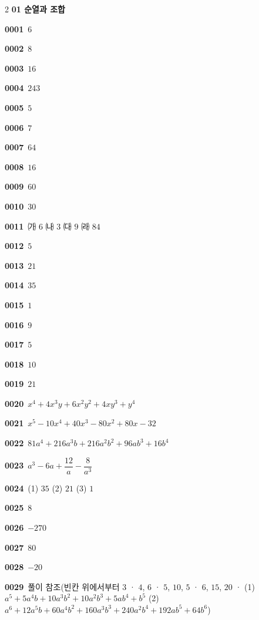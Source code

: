 \documentclass[10pt,a4paper]{article}
\begin{document}
\begin{multicols}{2}\small
\noindent\textbf{01 순열과 조합}\par\smallskip
\noindent\textbf{0001}\ $6$\par
\noindent\textbf{0002}\ $8$\par
\noindent\textbf{0003}\ $16$\par
\noindent\textbf{0004}\ $243$\par
\noindent\textbf{0005}\ $5$\par
\noindent\textbf{0006}\ $7$\par
\noindent\textbf{0007}\ $64$\par
\noindent\textbf{0008}\ $16$\par
\noindent\textbf{0009}\ $60$\par
\noindent\textbf{0010}\ $30$\par
\noindent\textbf{0011}\ ㈎ $6$ \quad ㈏ $3$ \quad ㈐ $9$ \quad ㈑ $84$\par
\noindent\textbf{0012}\ $5$\par
\noindent\textbf{0013}\ $21$\par
\noindent\textbf{0014}\ $35$\par
\noindent\textbf{0015}\ $1$\par
\noindent\textbf{0016}\ $9$\par
\noindent\textbf{0017}\ $5$\par
\noindent\textbf{0018}\ $10$\par
\noindent\textbf{0019}\ $21$\par
\noindent\textbf{0020}\ $x^4+4x^3y+6x^2y^2+4xy^3+y^4$\par
\noindent\textbf{0021}\ $x^5-10x^4+40x^3-80x^2+80x-32$\par
\noindent\textbf{0022}\ $81a^4+216a^3b+216a^2b^2+96ab^3+16b^4$\par
\noindent\textbf{0023}\ $a^3-6a+\dfrac{12}{a}-\dfrac{8}{a^3}$\par
\noindent\textbf{0024}\ (1) $35$ \quad (2) $21$ \quad (3) $1$\par
\noindent\textbf{0025}\ $8$\par
\noindent\textbf{0026}\ $-270$\par
\noindent\textbf{0027}\ $80$\par
\noindent\textbf{0028}\ $-20$\par
\noindent\textbf{0029}\ 풀이 참조(빈칸 위에서부터 $3$ · $4$, $6$ · $5$, $10$, $5$ · $6$, $15$, $20$ · (1) $a^5+5a^4b+10a^3b^2+10a^2b^3+5ab^4+b^5$ (2) $a^6+12a^5b+60a^4b^2+160a^3b^3+240a^2b^4+192ab^5+64b^6$)\par

\end{multicols}
\end{document}
